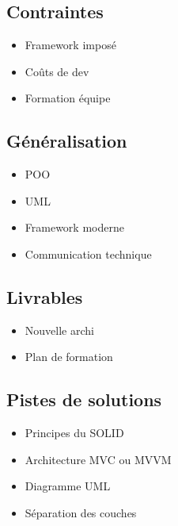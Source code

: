 \subsection*{Contraintes}
{}
\begin{itemize}
	\item Framework imposé
	\item Coûts de dev
	\item Formation équipe
\end{itemize}

\subsection*{Généralisation}
{}
\begin{itemize}
	\item POO
	\item UML
	\item Framework moderne
	\item Communication technique
\end{itemize}

\subsection*{Livrables}
{}
\begin{itemize}
	\item Nouvelle archi
	\item Plan de formation
\end{itemize}

\subsection*{Pistes de solutions}
{}
\begin{itemize}
	\item Principes du SOLID
	\item Architecture MVC ou MVVM
	\item Diagramme UML
	\item Séparation des couches
\end{itemize}

